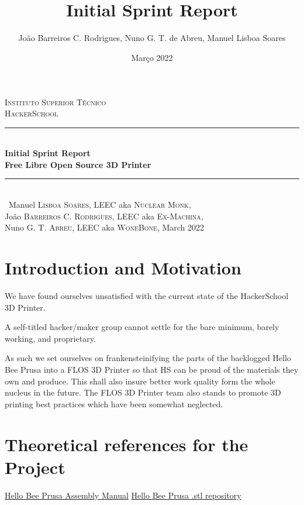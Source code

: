 \documentclass[a4paper,12pt]{article}
\date{Março 2022}
\title{ \\ \large {Initial Sprint Report}}
\author{João Barreiros C. Rodrigues, Nuno G. T. de Abreu, Manuel Lisboa Soares }
\begin{document}
	\begin{titlepage} %
        \newcommand{\HRule}{\rule{\linewidth}{0.5mm}} %
        \center %
        \textsc{\LARGE Instituto Superior Técnico}\\[1.5cm] %
	\textsc{\Large HackerSchool}\\[0.25cm]
        \HRule\\[0.4cm]
        {\LARGE\bfseries Initial Sprint Report}\\[0.4cm] %
	{\huge\bfseries Free Libre Open Source 3D Printer}\\[0.4cm] %
        \HRule\\[1.5cm]\
	Manuel \textsc{Lisboa Soares}, LEEC aka \textsc{Nuclear Monk},\\
        João \textsc{Barreiros C. Rodrigues}, LEEC aka \textsc{Ex-Machina},\\
	Nuno \textsc{G. T. Abreu}, LEEC aka \textsc{WoneBone},
        \vfill\vfill\vfill %
        {\large March 2022} %
        \vfill %
\end{titlepage}
	\newpage
		\tableofcontents
	\section{Introduction and Motivation}
	\par
	We have found ourselves unsatisfied with the current state of the HackerSchool 3D Printer. \par
	A self-titled hacker/maker group cannot settle for the bare minimum, barely  working, and proprietary. \par
	As such we set ourselves on frankensteinifying the parts of the backlogged Hello Bee Prusa into a FLOS 3D Printer so that HS can be proud of the materials they own and produce. 
	This shall also insure better work quality form the whole nucleus in the future. The FLOS 3D Printer team also stands to promote 3D printing best practices which have been somewhat neglected.
	\section{Theoretical references for the Project}
	\par
	\href{https://www.manualslib.com/manual/1051705/Beeverycreative-Hello-Bee-Prusa.html?page=2#manual}{Hello Bee Prusa Assembly Manual} \newline
	\href{https://github.com/beeverycreative/helloBEEprusa-hardware/tree/master/helloBEEprusa-printed_parts}{Hello Bee Prusa .stl repository} \par
	\clearpage	
\end{document}
